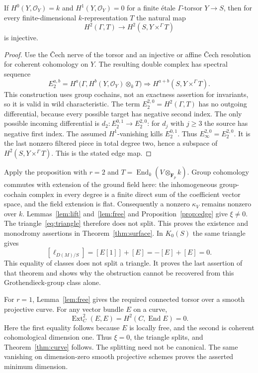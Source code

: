 \documentclass[11pt]{article}
\newcommand{\Fp}{\mathbf F_p}\newcommand{\OO}{\mathcal O}
\DeclareMathOperator{\End}{End}\DeclareMathOperator{\Hom}{Hom}
\DeclareMathOperator{\Ext}{Ext}\DeclareMathOperator{\Tor}{Tor}
\theoremstyle{definition}\newtheorem{definition}[theorem]{Definition}
\theoremstyle{remark}\newtheorem{remark}[theorem]{Remark}
\begin{document}
\begin{proposition}\label{prop:edge}
If $H^0(Y,\OO_Y)=k$ and $H^1(Y,\OO_Y)=0$ for a finite \'etale $\Gamma$-torsor $Y\to S$, then for every finite-dimensional $k$-representation $T$ the natural map
\[
 H^2(\Gamma,T)\longrightarrow H^2(S,Y\times^\Gamma T)
\]
is injective.
\end{proposition}
\begin{proof}
Use the \v Cech nerve of the torsor and an injective or affine \v Cech resolution for coherent cohomology on $Y$. The resulting double complex has spectral sequence
\[
 E_2^{a,b}=H^a\bigl(\Gamma,H^b(Y,\OO_Y)\otimes_k T\bigr)
          \Longrightarrow H^{a+b}(S,Y\times^\Gamma T).
\]
This construction uses group cochains, not an exactness assertion for invariants, so it is valid in wild characteristic. The term $E_2^{2,0}=H^2(\Gamma,T)$ has no outgoing differential, because every possible target has negative second index. The only possible incoming differential is $d_2:E_2^{0,1}\to E_2^{2,0}$: for $d_j$ with $j\geq3$ the source has negative first index. The assumed $H^1$-vanishing kills $E_2^{0,1}$. Thus $E_\infty^{2,0}=E_2^{2,0}$. It is the last nonzero filtered piece in total degree two, hence a subspace of $H^2(S,Y\times^\Gamma T)$. This is the stated edge map.
\end{proof}

Apply the proposition with $r=2$ and $T=\End_k(V\otimes_{\Fp}k)$. Group cohomology commutes with extension of the ground field here: the inhomogeneous group-cochain complex in every degree is a finite direct sum of the coefficient vector space, and the field extension is flat. Consequently a nonzero $\kappa_V$ remains nonzero over $k$. Lemmas~\ref{lem:lift} and~\ref{lem:free} and Proposition~\ref{prop:edge} give $\xi\ne0$. The triangle~\eqref{eq:triangle} therefore does not split. This proves the existence and monodromy assertions in Theorem~\ref{thm:surface}. In $K_0(S)$ the same triangle gives
\[
 [\ell_{D(M)/S}]=[E[1]]+[E]=-[E]+[E]=0.
\]
This equality of classes does not split a triangle. It proves the last assertion of that theorem and shows why the obstruction cannot be recovered from this Grothendieck-group class alone.

For $r=1$, Lemma~\ref{lem:free} gives the required connected torsor over a smooth projective curve. For any vector bundle $E$ on a curve,
\[
 \Ext^2_C(E,E)=H^2(C,\End E)=0.
\]
Here the first equality follows because $E$ is locally free, and the second is coherent cohomological dimension one. Thus $\xi=0$, the triangle splits, and Theorem~\ref{thm:curve} follows. The splitting need not be canonical. The same vanishing on dimension-zero smooth projective schemes proves the asserted minimum dimension.
\end{document}
